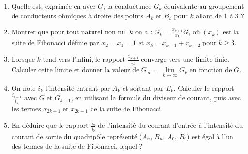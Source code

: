 \begin{exercice}
  \begin{enumerate}
    \item Quelle est, exprimée en avec \(G\), la conductance \(G_k\) équivalente au groupement de conducteurs ohmiques à droite des points \(A_k\) et \(B_k\) pour \(k\) allant de 1 à 3 ?
    \item Montrer que pour tout naturel non nul \(k\) on a : \(G_k = \frac{x_{k+1}}{x_k} G\), où \((x_k)\) est la suite de Fibonacci définie par \(x_2=x_1=1\) et \(x_k = x_{k-1}+x_{k-2}\) pour \(k \geq 3\).
    \item Lorsque \(k\) tend vers l'infini, le rapport \(\frac{x_{k+1}}{x_k}\) converge vers une limite finie. Calculer cette limite et donner la valeur de \(G_\infty = \lim\limits_{k \to \infty} G_k\) en fonction de \(G\).
    \item On note \(i_k\) l'intensité entrant par \(A_k\) et sortant par \(B_k\). Calculer le rapport \(\frac{i_{k-1}}{i_k}\) avec \(G\) et \(G_{k-1}\), en utilisant la formule du diviseur de courant, puis avec les termes \(x_{2k+1}\) et \(x_{2k-1}\) de la suite de Fibonacci.
    \item En déduire que le rapport \(\frac{i_n}{i_0}\) de l'intensité du courant d'entrée à l'intensité du courant de sortie du quadripôle représenté (\(A_n\), \(B_n\), \(A_0\), \(B_0\)) est égal à l'un des termes de la suite de Fibonacci, lequel ? 
  \end{enumerate}
\end{exercice}
